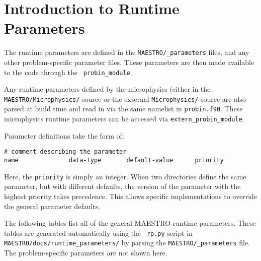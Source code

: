 
\section{Introduction to Runtime Parameters}
\label{sec:runtime_parameters}

The runtime parameters are defined in the {\tt MAESTRO/\_parameters}
files, and any other problem-specific parameter files.  These
parameters are then made available to the code through the {\tt
  probin\_module}.

Any runtime parameters defined by the microphysics (either in the
{\tt MAESTRO/Microphysics/} source or the external {\tt Microphysics/}
source are also parsed at build time and read in via the same
namelist in {\tt probin.f90}.  These microphysics runtime parameters
can be accessed via {\tt extern\_probin\_module}.

Parameter definitions take the form of:
\begin{verbatim}
# comment describing the parameter
name              data-type       default-value      priority
\end{verbatim} 
Here, the {\tt priority} is simply an integer.  When two directories
define the same parameter, but with different defaults, the version of
the parameter with the highest priority takes precedence.  This allows
specific implementations to override the general parameter defaults.

The following tables list all of the general
MAESTRO runtime parameters.
These tables are generated automatically using the {\tt
  rp.py} script in {\tt MAESTRO/docs/runtime\_parameters/} by parsing
the {\tt MAESTRO/\_parameters} file.  The problem-specific parameters
are not shown here.
